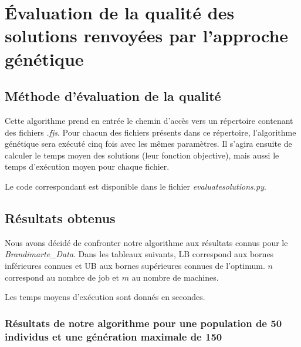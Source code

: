 \section{Évaluation de la qualité des solutions renvoyées par l'approche génétique}

\subsection{Méthode d'évaluation de la qualité}

Cette algorithme prend en entrée le chemin d'accès vers un répertoire contenant des fichiers \textit{.fjs}. Pour chacun des fichiers présents dans ce répertoire, l'algorithme génétique sera exécuté cinq fois avec les mêmes paramètres. Il s'agira ensuite de calculer le temps moyen des solutions (leur fonction objective), mais aussi le temps d'exécution moyen pour chaque fichier.

Le code correspondant est disponible dans le fichier \textit{evaluatesolutions.py}.

\subsection{Résultats obtenus}

Nous avons décidé de confronter notre algorithme aux résultats connus pour le \textit{Brandimarte\_Data}. Dans les tableaux suivants, LB correspond aux bornes inférieures connues et UB aux bornes supérieures connues de l'optimum. $n$ correspond au nombre de job et $m$ au nombre de machines.

Les temps moyens d'exécution sont donnés en secondes.

\subsubsection{Résultats de notre algorithme pour une population de 50 individus et une génération maximale de 150}

